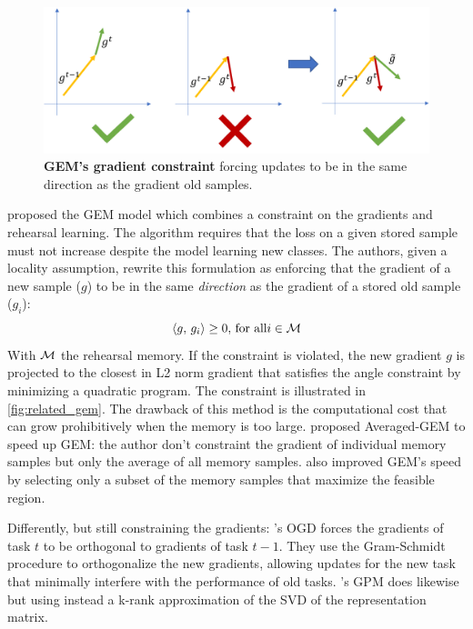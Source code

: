 \begin{figure}[tb]
      \begin{center}
            \includegraphics[width=1.0\linewidth]{images/related/gem.pdf}
      \end{center}
      \caption{\textbf{GEM's gradient constraint} forcing updates to be in the same direction as the
            gradient \wrt old samples.}
      \label{fig:related_gem}
\end{figure}

\cite{lopezpaz2017gem} proposed the GEM model which combines a constraint on the gradients and
rehearsal learning. The algorithm requires that the loss on a given stored sample must not increase
despite the model learning new classes. The authors, given a locality assumption, rewrite this
formulation as enforcing that the gradient of a new sample ($g$) to be in the same \textit{direction} as
the gradient of a stored old sample ($g_i$):
%
\begin{equation}
      \langle g,\, g_i\rangle \ge 0,\, \text{for all} i \in \mathcal{M}
\end{equation}
%
With $\mathcal{M}$ the rehearsal memory. If the constraint is violated, the new gradient $g$ is projected
to the closest in L2 norm gradient that satisfies the angle constraint by minimizing a quadratic
program. The constraint is illustrated in \autoref{fig:related_gem}. The drawback of this method is
the computational cost that can grow prohibitively when the memory is too large.
\cite{chaudhry2019AGEM} proposed Averaged-GEM to speed up GEM: the author don't constraint the
gradient of individual memory samples but only the average of all memory samples.
\cite{aljundi2019gradientselection} also improved GEM's speed by selecting only a subset of the
memory samples that maximize the feasible region.

Differently, but still constraining the gradients: \cite{farajtabar2020ogd}'s OGD forces the gradients of
task $t$ to be orthogonal to gradients of task $t-1$. They use the Gram-Schmidt procedure to
orthogonalize the new gradients, allowing updates for the new task that minimally interfere with the
performance of old tasks. \cite{saha2021gpm}'s GPM does likewise but using instead a k-rank
approximation of the SVD of the representation matrix.


